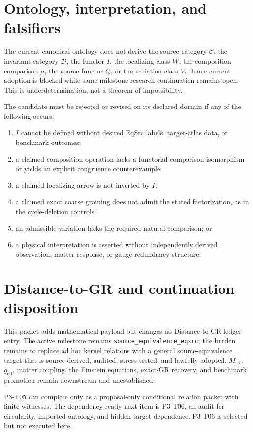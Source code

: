 \documentclass[11pt]{article}
\begin{document}
\section{Ontology, interpretation, and falsifiers}

The current canonical ontology does not derive the source category
\(\mathcal C\), the invariant category \(\mathcal D\), the functor \(I\), the
localizing class \(W\), the composition comparison \(\mu\), the coarse functor
\(Q\), or the variation class \(V\).  Hence current adoption is blocked while
same-milestone research continuation remains open.  This is
underdetermination, not a theorem of impossibility.

The candidate must be rejected or revised on its declared domain if any of the
following occurs:
\begin{enumerate}
  \item \(I\) cannot be defined without desired EqSrc labels, target-atlas
  data, or benchmark outcomes;
  \item a claimed composition operation lacks a functorial comparison
  isomorphism or yields an explicit congruence counterexample;
  \item a claimed localizing arrow is not inverted by \(I\);
  \item a claimed exact coarse graining does not admit the stated
  factorization, as in the cycle-deletion controls;
  \item an admissible variation lacks the required natural comparison; or
  \item a physical interpretation is asserted without independently derived
  observation, matter-response, or gauge-redundancy structure.
\end{enumerate}

\section{Distance-to-GR and continuation disposition}

This packet adds mathematical payload but changes no Distance-to-GR ledger
entry.  The active milestone remains \texttt{source\_equivalence\_eqsrc}; the
burden remains to replace ad hoc kernel relations with a general
source-equivalence target that is source-derived, audited, stress-tested, and
lawfully adopted.  \(M_{\mathrm{src}}\), \(g_{\mathrm{eff}}\), matter
coupling, the Einstein equations, exact-GR recovery, and benchmark promotion
remain downstream and unestablished.

P3-T05 can complete only as a proposal-only conditional relation packet with
finite witnesses.  The dependency-ready next item is P3-T06, an audit for
circularity, imported ontology, and hidden target dependence.  P3-T06 is
selected but not executed here.
\end{document}
